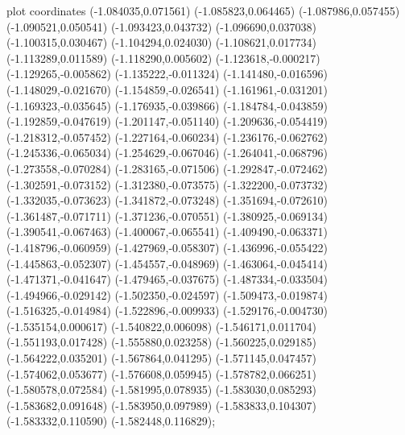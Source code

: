 { plot coordinates {(-1.084035,0.071561) (-1.085823,0.064465) (-1.087986,0.057455) (-1.090521,0.050541) (-1.093423,0.043732) (-1.096690,0.037038) (-1.100315,0.030467) (-1.104294,0.024030) (-1.108621,0.017734) (-1.113289,0.011589) (-1.118290,0.005602) (-1.123618,-0.000217) (-1.129265,-0.005862) (-1.135222,-0.011324) (-1.141480,-0.016596) (-1.148029,-0.021670) (-1.154859,-0.026541) (-1.161961,-0.031201) (-1.169323,-0.035645) (-1.176935,-0.039866) (-1.184784,-0.043859) (-1.192859,-0.047619) (-1.201147,-0.051140) (-1.209636,-0.054419) (-1.218312,-0.057452) (-1.227164,-0.060234) (-1.236176,-0.062762) (-1.245336,-0.065034) (-1.254629,-0.067046) (-1.264041,-0.068796) (-1.273558,-0.070284) (-1.283165,-0.071506) (-1.292847,-0.072462) (-1.302591,-0.073152) (-1.312380,-0.073575) (-1.322200,-0.073732) (-1.332035,-0.073623) (-1.341872,-0.073248) (-1.351694,-0.072610) (-1.361487,-0.071711) (-1.371236,-0.070551) (-1.380925,-0.069134) (-1.390541,-0.067463) (-1.400067,-0.065541) (-1.409490,-0.063371) (-1.418796,-0.060959) (-1.427969,-0.058307) (-1.436996,-0.055422) (-1.445863,-0.052307) (-1.454557,-0.048969) (-1.463064,-0.045414) (-1.471371,-0.041647) (-1.479465,-0.037675) (-1.487334,-0.033504) (-1.494966,-0.029142) (-1.502350,-0.024597) (-1.509473,-0.019874) (-1.516325,-0.014984) (-1.522896,-0.009933) (-1.529176,-0.004730) (-1.535154,0.000617) (-1.540822,0.006098) (-1.546171,0.011704) (-1.551193,0.017428) (-1.555880,0.023258) (-1.560225,0.029185) (-1.564222,0.035201) (-1.567864,0.041295) (-1.571145,0.047457) (-1.574062,0.053677) (-1.576608,0.059945) (-1.578782,0.066251) (-1.580578,0.072584) (-1.581995,0.078935) (-1.583030,0.085293) (-1.583682,0.091648) (-1.583950,0.097989) (-1.583833,0.104307) (-1.583332,0.110590) (-1.582448,0.116829)};
}
